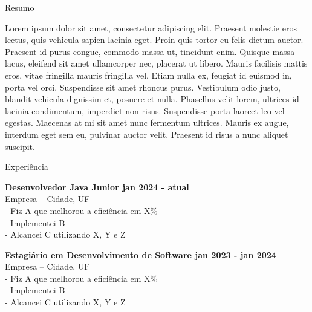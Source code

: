 \documentclass{resume} %
\begin{document}

\begin{rSection}{Resumo}

{Lorem ipsum dolor sit amet, consectetur adipiscing elit. Praesent molestie eros lectus, quis vehicula sapien lacinia eget. Proin quis tortor eu felis dictum auctor. Praesent id purus congue, commodo massa ut, tincidunt enim. Quisque massa lacus, eleifend sit amet ullamcorper nec, placerat ut libero. Mauris facilisis mattis eros, vitae fringilla mauris fringilla vel. Etiam nulla ex, feugiat id euismod in, porta vel orci. Suspendisse sit amet rhoncus purus. Vestibulum odio justo, blandit vehicula dignissim et, posuere et nulla. Phasellus velit lorem, ultrices id lacinia condimentum, imperdiet non risus. Suspendisse porta laoreet leo vel egestas. Maecenas at mi sit amet nunc fermentum ultrices. Mauris ex augue, interdum eget sem eu, pulvinar auctor velit. Praesent id risus a nunc aliquet suscipit.}


\end{rSection}


\begin{rSection}{Experiência}

{\bf Desenvolvedor Java Junior \hfill {jan 2024 - atual}}\\
{Empresa – {Cidade, UF}}\\
- Fiz A que melhorou a eficiência em X\%\\
- Implementei B\\
- Alcancei C utilizando X, Y e Z\\

\vspace{1.25em}

{\bf Estagiário em Desenvolvimento de Software \hfill {jan 2023 - jan 2024}}\\
{Empresa – {Cidade, UF}}\\
- Fiz A que melhorou a eficiência em X\%\\
- Implementei B\\
- Alcancei C utilizando X, Y e Z\\

\end{rSection} 
\end{document}
